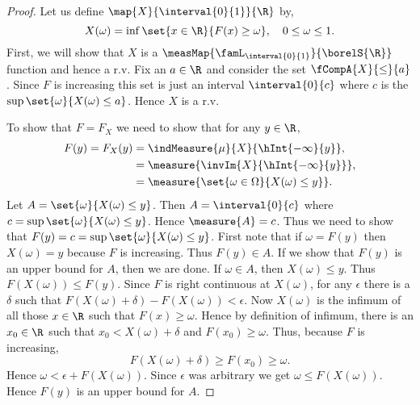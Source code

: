 \begin{proof}
    Let us define $\map{X}{\interval{0}{1}}{\R}$ by,
    \[X(\omega) = \inf\set{x\in\R}{F(x)\geq \omega},\quad 0\leq\omega\leq 1.\]
    First, we will show that $X$ is a $\measMap{\famL_{\interval{0}{1}}}{\borelS{\R}}$ function and hence a 
    r.v. Fix an $a \in \R$ and consider the set $\fCompA{X}{\leq}{a}$. Since $F$ is increasing this set is
    just an interval $\interval{0}{c}$ where $c$ is the $\sup\set{\omega}{X(\omega)\leq a}$. Hence $X$ is a r.v.

    To show that $F = F_X$ we need to show that for any $y\in \R$,
    \begin{align*}
	F(y) = F_X(y) &= \indMeasure{\mu}{X}{\hInt{-\infty}{y}},\\
	& = \measure{\invIm{X}{\hInt{-\infty}{y}}},\\
	& = \measure{\set{\omega\in\Omega}{X(\omega)\leq y}}.
    \end{align*}
    Let $A = \set{\omega}{X(\omega)\leq y}$. Then $A = \interval{0}{c}$ where 
    $c = \sup\set{\omega}{X(\omega)\leq y}$. Hence $\measure{A} = c$. Thus we need
    to show that $F(y) = c = \sup\set{\omega}{X(\omega)\leq y}$.
    First note that if $\omega = F(y)$ then $X(\omega) = y$ because $F$ is increasing. Thus $F(y) \in A$. If
    we show that $F(y)$ is an upper bound for $A$, then we are done. If $\omega \in A$, then $X(\omega) \leq
    y$. Thus $F(X(\omega)) \leq F(y)$. Since $F$ is right continuous at $X(\omega)$, for any $\epsilon$ there
    is a $\delta$ such that $F(X(\omega) + \delta) - F(X(\omega)) < \epsilon$. Now $X(\omega)$ is the infimum
    of all those $x \in \R$ such that $F(x) \geq \omega$. Hence by definition of infimum, 
    there is an $x_0 \in\R$ such that $x_0 <
    X(\omega) + \delta$ and $F(x_0) \geq \omega$. Thus, because $F$ is increasing,
    \[F(X(\omega)+\delta) \geq F(x_0) \geq \omega.\]
    Hence $\omega < \epsilon + F(X(\omega))$. Since $\epsilon$ was arbitrary we get $\omega \leq
    F(X(\omega))$. Hence $F(y)$ is an upper bound for $A$.
\end{proof}
